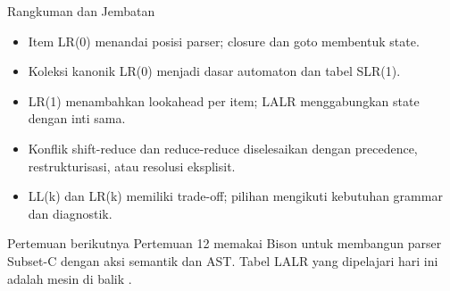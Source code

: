 \documentclass[aspectratio=169,10pt,t]{beamer}
\begin{document}
\begin{frame}{Rangkuman dan Jembatan}
  \begin{itemize}
    \item Item LR(0) menandai posisi parser; closure dan goto membentuk
          state.
    \item Koleksi kanonik LR(0) menjadi dasar automaton dan tabel
          SLR(1).
    \item LR(1) menambahkan lookahead per item; LALR menggabungkan
          state dengan inti sama.
    \item Konflik shift-reduce dan reduce-reduce diselesaikan dengan
          precedence, restrukturisasi, atau resolusi eksplisit.
    \item LL(k) dan LR(k) memiliki trade-off; pilihan mengikuti
          kebutuhan grammar dan diagnostik.
  \end{itemize}

  \vspace{4pt}
  \begin{exampleblock}{Pertemuan berikutnya}
    Pertemuan 12 memakai Bison untuk membangun parser Subset-C dengan
    aksi semantik dan AST. Tabel LALR yang dipelajari hari ini adalah
    mesin di balik .
  \end{exampleblock}
\end{frame}
\end{document}
